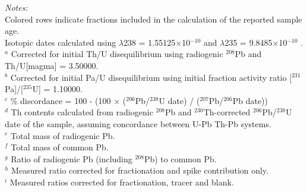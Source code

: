\begin{table}
\flushleft \emph{Notes:} \\
Colored rows indicate fractions included in the calculation of the reported sample age. \\
Isotopic dates calculated using $\lambda$238 = 1.55125$\times$10$^{-10}$ and $\lambda$235 = 9.8485$\times$10$^{-10}$ \citep{Jaffey1971a}. \\
 $^{a}$  Corrected for initial Th/U disequilibrium using radiogenic $^{208}$Pb and Th/U[magma] = 3.50000. \\
 $^{b}$ Corrected for initial Pa/U disequilibrium using initial fraction activity ratio [$^{231}$Pa]/[$^{235}$U] = 1.10000. \\
 $^{c}$ \% discordance = 100 - (100 $\times$ ($^{206}$Pb/$^{238}$U date) / ($^{207}$Pb/$^{206}$Pb date)) \\
 $^{d}$ Th contents calculated from radiogenic $^{208}$Pb and $^{230}$Th-corrected $^{206}$Pb/$^{238}$U date of the sample, assuming concordance between U-Pb Th-Pb systems. \\
 $^{e}$ Total mass of radiogenic Pb. \\
 $^{f}$ Total mass of common Pb. \\
 $^{g}$ Ratio of radiogenic Pb (including $^{208}$Pb) to common Pb. \\
 $^{h}$ Measured ratio corrected for fractionation and spike contribution only. \\
 $^{i}$ Measured ratios corrected for fractionation, tracer and blank.
\end{table}

